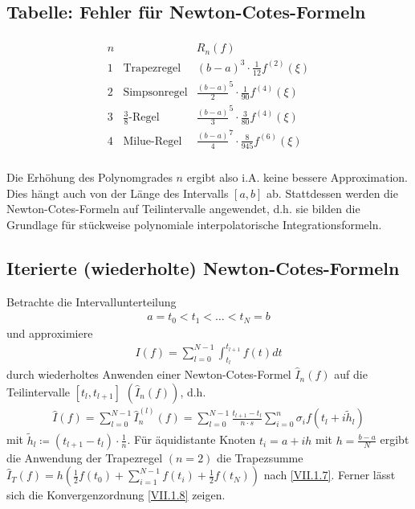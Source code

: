 \documentclass[ngerman,fontsize=11pt, paper=a4, parskip=half, titlepage=true, toc=bib]{scrbook}
\theoremstyle{definition}
\theoremstyle{plain}
\newcommand{\subsectione}[1]{\addtocounter{Def}{1}\subsection{#1}}
\begin{document}
\subsectione{Tabelle: Fehler für Newton-Cotes-Formeln}
\begin{gather*}\label{7.2.9}
  \begin{array}{cll}
    n & & R_n(f)\\
    1 &\text{Trapezregel} &(b-a)^3\cdot\frac{1}{12}f^{(2)}(\xi)\\
    2 &\text{Simpsonregel}&\frac{(b-a)}{2}^5\cdot\frac{1}{90}f^{(4)}(\xi)\\
    3 &\text{$\frac{3}{8}$-Regel}&\frac{(b-a)}{3}^5\cdot\frac{3}{80}f^{(4)}(\xi)\\
    4 &\text{Milue-Regel}
        &\frac{(b-a)}{4}^7\cdot\frac{8}{945}f^{(6)}(\xi)\\
  \end{array}
\end{gather*}

Die Erhöhung des Polynomgrades $n$
ergibt also
i.A. keine bessere Approximation.
Dies hängt auch von der Länge des
Intervalls $[a,b]$ ab.
Stattdessen werden die
Newton-Cotes-Formeln auf
Teilintervalle angewendet, 
d.h. sie bilden die Grundlage für
stückweise polynomiale
interpolatorische Integrationsformeln.

\subsectione{Iterierte (wiederholte)
  Newton-Cotes-Formeln}
Betrachte die Intervallunterteilung
\begin{gather*}
  a=t_0<t_1<\ldots<t_N=b
\end{gather*}
und approximiere
\begin{gather*}
  I(f) = \sum_{l=0}^{N-1}\int_{t_l}^{t_{l+1}}f(t)dt
\end{gather*}
durch wiederholtes Anwenden einer Newton-Cotes-Formel
$\hat{I}_n(f)$ auf die Teilintervalle $[t_l, t_{l+1}]$
$(\hat{I}_n(f))$,
d.h.
\begin{gather}
  \hat{I}(f) = \sum_{l=0}^{N-1}\hat{I}_n^{(l)}(f)
  = \sum_{l=0}^{N-1}\frac{t_{l+1}-t_l}{n\cdot s}
  \sum_{i=0}^n \sigma_i f(t_l+i\widetilde{h}_l)
  \label{VII.2.11}
\end{gather}
mit $\widetilde{h}_l\coloneqq (t_{l+1}-t_l)\cdot \frac{1}{n}$.
Für äquidistante Knoten $t_i=a+ih$ mit $h=\frac{b-a}{N}$
ergibt die Anwendung der Trapezregel $(n=2)$
die Trapezsumme 
$\hat{I}_T(f) = h\left(
  \frac{1}{2}f(t_0)+\sum_{i=1}^{N-1}f(t_i) +\frac{1}{2}f(t_N)
\right)$
nach \eqref{VII.1.7}. 
Ferner lässt sich die Konvergenzordnung \eqref{VII.1.8} zeigen.
\end{document}
